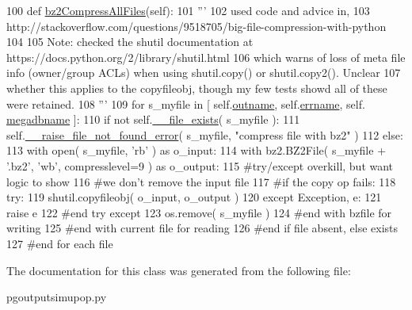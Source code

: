 \begin{DoxyCode}
100     \textcolor{keyword}{def }\hyperlink{classpgoutputsimupop_1_1PGOutputSimuPop_a0ac729b2b20cb781b36ef240c23407a0}{bz2CompressAllFiles}(self):
101         \textcolor{stringliteral}{'''}
102 \textcolor{stringliteral}{        used code and advice in, }
103 \textcolor{stringliteral}{        http://stackoverflow.com/questions/9518705/big-file-compression-with-python}
104 \textcolor{stringliteral}{}
105 \textcolor{stringliteral}{        Note: checked the shutil documentation at https://docs.python.org/2/library/shutil.html}
106 \textcolor{stringliteral}{        which warns of loss of meta file info (owner/group ACLs) when using shutil.copy() or
       shutil.copy2().  Unclear}
107 \textcolor{stringliteral}{        whether this applies to the copyfileobj, though my few tests showd all of these were retained.}
108 \textcolor{stringliteral}{        '''}
109         \textcolor{keywordflow}{for} s\_myfile \textcolor{keywordflow}{in} [ self.\hyperlink{classpgoutputsimupop_1_1PGOutputSimuPop_a5c7560f1b4b68e943f5f900cd27a417f}{outname}, self.\hyperlink{classpgoutputsimupop_1_1PGOutputSimuPop_a109549817b2f81d6bbb0480e8b58a2b8}{errname}, self.
      \hyperlink{classpgoutputsimupop_1_1PGOutputSimuPop_aad571ab6039c7478d64a909718688e47}{megadbname} ]:
110             \textcolor{keywordflow}{if} \textcolor{keywordflow}{not} self.\hyperlink{classpgoutputsimupop_1_1PGOutputSimuPop_adab854331c0b53f20f9632aa969da304}{\_\_file\_exists}( s\_myfile ):
111                 self.\hyperlink{classpgoutputsimupop_1_1PGOutputSimuPop_ad1643489db4241cb499881580ff1d99f}{\_\_raise\_file\_not\_found\_error}( s\_myfile, \textcolor{stringliteral}{"compress file
       with bz2"}  )
112             \textcolor{keywordflow}{else}:
113                 with open( s\_myfile, \textcolor{stringliteral}{'rb'} ) \textcolor{keyword}{as} o\_input:
114                     with bz2.BZ2File( s\_myfile + \textcolor{stringliteral}{'.bz2'}, \textcolor{stringliteral}{'wb'}, compresslevel=9 ) \textcolor{keyword}{as} o\_output:
115                         \textcolor{comment}{#try/except overkill, but want logic to show}
116                         \textcolor{comment}{#we don't remove the input file}
117                         \textcolor{comment}{#if the copy op fails:}
118                         \textcolor{keywordflow}{try}: 
119                             shutil.copyfileobj( o\_input, o\_output )
120                         \textcolor{keywordflow}{except} Exception,  e:
121                             \textcolor{keywordflow}{raise} e
122                         \textcolor{comment}{#end try except}
123                         os.remove( s\_myfile )   
124                     \textcolor{comment}{#end with bzfile for writing}
125                 \textcolor{comment}{#end with current file for reading}
126             \textcolor{comment}{#end if file absent, else exists}
127         \textcolor{comment}{#end for each file}
\end{DoxyCode}


The documentation for this class was generated from the following file\+:\begin{DoxyCompactItemize}
\item 
pgoutputsimupop.\+py\end{DoxyCompactItemize}
